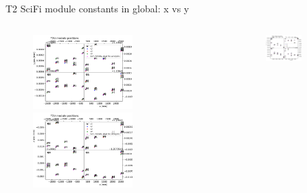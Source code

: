 \documentclass[aspectratio=1610, 12pt]{beamer}
\begin{document}
\begin{frame}{T2 SciFi module constants in global: x vs y}
  \begin{columns}
    \begin{column}[c]{0.5\textwidth}
      \begin{figure}
        \includegraphics[width=0.61\textwidth]{plots/out_x_y_pos/retest_x_vs_zT2U.pdf}
        \includegraphics[width=0.61\textwidth]{plots/out_x_y_pos/retest_x_vs_zT2V.pdf}
      \end{figure}
    \end{column}
    \begin{column}[c]{0.5\textwidth}
      \begin{figure}
        \includegraphics[width=0.61\textwidth]{plots/out_x_y_pos/retest_x_vs_zT2X1.pdf}

\end{figure}
\end{column}
\end{columns}
\end{frame}
\end{document}
